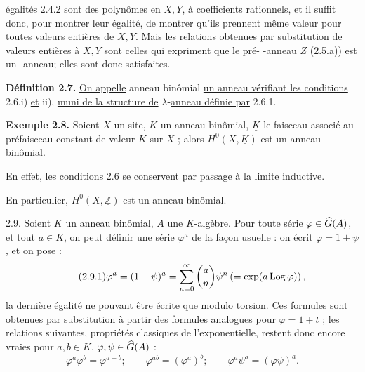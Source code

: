 
égalités 2.4.2 sont des polynômes en \(X,Y\), à coefficients rationnels, et il suffit donc, pour montrer leur égalité, de montrer qu'ils prennent même valeur pour toutes valeurs entières de \(X,Y\). Mais les relations obtenues par substitution de valeurs entières à \(X,Y\) sont celles qui expriment que le pré- -anneau \(Z\) (2.5.a)) est un -anneau; elles sont donc satisfaites.

\textbf{Définition 2.7.} \uline{On appelle} anneau binômial \uline{un anneau vérifiant les conditions} 2.6.i) \uline{et} ii), \uline{muni de la structure de} \(\lambda\)-\uline{anneau définie par} 2.6.1.

\textbf{Exemple 2.8.} Soient \(X\) un site, \(K\) un anneau binômial, \(\underline{K}\) le faisceau associé au préfaisceau constant de valeur \(K\) sur \(X\) ; alors \(H^0(X,\underline{K})\) est un anneau binômial.

En effet, les conditions 2.6 se conservent par passage à la limite inductive.

En particulier, \(H^0(X,\underline{\mathbb Z})\) est un anneau binômial.

2.9. Soient \(K\) un anneau binômial, \(A\) une \(K\)-algèbre. Pour toute série \(\varphi\in\Ghat(A)\), et tout \(a\in K\), on peut définir une série \(\varphi^a\) de la façon usuelle : on écrit \(\varphi=1+\psi\), et on pose :
\begin{equation}\tag{2.9.1}
  \varphi^a=(1+\psi)^a
  =
  \sum_{n=0}^{\infty}\binom{a}{n}\psi^n
  \left(=\exp(a\Log\varphi)\right),
\end{equation}
la dernière égalité ne pouvant être écrite que modulo torsion. Ces formules sont obtenues par substitution à partir des formules analogues pour \(\varphi=1+t\) ; les relations suivantes, propriétés classiques de l'exponentielle, restent donc encore vraies pour \(a,b\in K\), \(\varphi,\psi\in\Ghat(A)\) :
\begin{equation}\tag{2.9.2}
  \varphi^a\varphi^b=\varphi^{a+b};\qquad
  \varphi^{ab}=(\varphi^a)^b;\qquad
  \varphi^a\psi^a=(\varphi\psi)^a .
\end{equation}



\providecommand{\Ghat}{\widehat G}
\providecommand{\Gg}{\widehat G_g}
\providecommand{\Gcirc}{\widehat G_{\circ}}
\providecommand{\Gnabla}{\widehat G_{\nabla}}
\providecommand{\Grhat}{\widehat{\operatorname{Gr}}}
\providecommand{\Log}{\operatorname{Log}}
\providecommand{\Fil}{\operatorname{Fil}}
\providecommand{\eps}{\varepsilon}
\renewcommand{\id}{\operatorname{id}}
\providecommand{\Sym}{\operatorname{Sym}}
\providecommand{\Mon}{\operatorname{Mon}}


